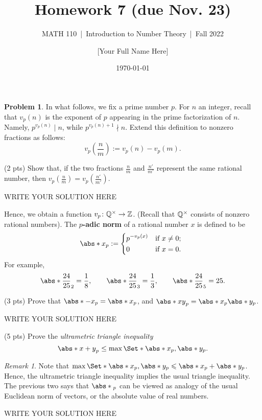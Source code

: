\documentclass[11pt]{article}
\title{Homework 7 (due Nov. 23)}
\author{[Your Full Name Here]}
\subtitle{MATH 110~|~Introduction to Number Theory~|~Fall 2022}
\date{\today}
\theoremstyle{plain}
\theoremstyle{definition}
\newtheorem{problem}{Problem}
\theoremstyle{remark}
\newtheorem*{remark}{Remark}
\numberwithin{equation}{problem}
\begin{document}
\maketitle

\begin{problem}
	In what follows, we fix a prime number $p$.
	For $n$ an integer, recall that $v_p(n)$ is the exponent of $p$ appearing in the prime factorization of $n$. Namely, $p^{v_p(n)}\mid n$, while $p^{v_p(n)+1}\nmid n$. Extend this definition to nonzero fractions as follows:
	\[
		v_p(\frac{n}{m}) := v_p(n) - v_p(m).
	\]
	\begin{listinprob}
		\item (2 pts) Show that, if the two fractions $\frac{n}{m}$ and $\frac{n'}{m'}$ represent the same rational number, then $v_p(\frac{n}{m})=v_p(\frac{n'}{m'})$.
	\end{listinprob}
\begin{solution} %
WRITE YOUR SOLUTION HERE
\end{solution}\clearpage %

	Hence, we obtain a function $v_p\colon\mathbb{Q}^{\times}\to\mathbb{Z}$. (Recall that $\mathbb{Q}^{\times}$ consists of nonzero rational numbers). The \textbf{$p$-adic norm} of a rational number $x$ is defined to be
	\[
		\abs*{x}_p:=
		\begin{dcases*}
			p^{-v_p(x)} & if $x\neq 0$;\\
			0 & if $x=0$.
		\end{dcases*}
	\]
	For example,
	\[
		\abs*{\frac{24}{25}}_{2} = \frac{1}{8},\qquad 
		\abs*{\frac{24}{25}}_{3} = \frac{1}{3},\qquad 
		\abs*{\frac{24}{25}}_{5} = 25.
	\]	
	\begin{listinprob}[resume]
		\item (3 pts) Prove that $\abs*{-x}_p = \abs*{x}_p$, and $\abs*{xy}_p = \abs*{x}_p\abs*{y}_p$.
\begin{solution} %
WRITE YOUR SOLUTION HERE
\end{solution}\clearpage %

		\item (5 pts) Prove the \emph{ultrametric triangle inequality}
		\[
			\abs*{x+y}_p \leq \max\Set*{\abs*{x}_p,\abs*{y}_p}.
		\]
	\end{listinprob}
	\begin{remark}
		Note that $\max\Set*{\abs*{x}_p,\abs*{y}_p}\le\abs*{x}_p+\abs*{y}_p$. Hence, the ultrametric triangle inequality implies the usual  triangle inequality. The previous two says that $\abs*{}_p$ can be viewed as analogy of the usual Euclidean norm of vectors, or the absolute value of real numbers.
	\end{remark}
\begin{solution} %
WRITE YOUR SOLUTION HERE
\end{solution}\clearpage %


\end{problem}
\end{document}
